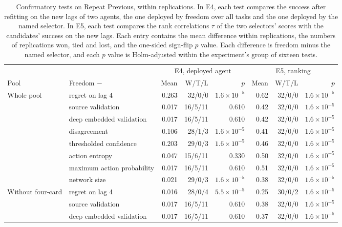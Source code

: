 \begin{table}[t]
\centering
\caption{Confirmatory tests on Repeat Previous, within replications. In E4, each test compares the success after refitting on the new lags of two agents, the one deployed by freedom over all tasks and the one deployed by the named selector. In E5, each test compares the rank correlations $\tau$ of the two selectors' scores with the candidates' success on the new lags. Each entry contains the mean difference within replications, the numbers of replications won, tied and lost, and the one-sided sign-flip $p$ value. Each difference is freedom minus the named selector, and each $p$ value is Holm-adjusted within the experiment's group of sixteen tests.}
\label{tab:rppair}
\footnotesize
\setlength{\tabcolsep}{3pt}
\begin{tabular}{@{}llrrrrrr@{}}
\toprule
 & & \multicolumn{3}{c}{E4, deployed agent} & \multicolumn{3}{c}{E5, ranking} \\
\cmidrule(lr){3-5}\cmidrule(lr){6-8}
Pool & Freedom $-$ & Mean & W/T/L & $p$ & Mean & W/T/L & $p$ \\
\midrule
Whole pool & regret on lag 4 & 0.263 & 32/0/0 & $1.6\times10^{-5}$ & 0.62 & 32/0/0 & $1.6\times10^{-5}$ \\
 & source validation & 0.017 & 16/5/11 & 0.610 & 0.42 & 32/0/0 & $1.6\times10^{-5}$ \\
 & deep embedded validation & 0.017 & 16/5/11 & 0.610 & 0.42 & 32/0/0 & $1.6\times10^{-5}$ \\
 & disagreement & 0.106 & 28/1/3 & $1.6\times10^{-5}$ & 0.41 & 32/0/0 & $1.6\times10^{-5}$ \\
 & thresholded confidence & 0.203 & 29/0/3 & $1.6\times10^{-5}$ & 0.46 & 32/0/0 & $1.6\times10^{-5}$ \\
 & action entropy & 0.047 & 15/6/11 & 0.330 & 0.50 & 32/0/0 & $1.6\times10^{-5}$ \\
 & maximum action probability & 0.017 & 16/5/11 & 0.610 & 0.51 & 32/0/0 & $1.6\times10^{-5}$ \\
 & network size & 0.021 & 29/0/3 & $1.6\times10^{-5}$ & 0.38 & 32/0/0 & $1.6\times10^{-5}$ \\
\midrule
Without four-card & regret on lag 4 & 0.016 & 28/0/4 & $5.5\times10^{-5}$ & 0.25 & 30/0/2 & $1.6\times10^{-5}$ \\
 & source validation & 0.017 & 16/5/11 & 0.610 & 0.38 & 32/0/0 & $1.6\times10^{-5}$ \\
 & deep embedded validation & 0.017 & 16/5/11 & 0.610 & 0.37 & 32/0/0 & $1.6\times10^{-5}$ \\

\end{tabular}
\end{table}
